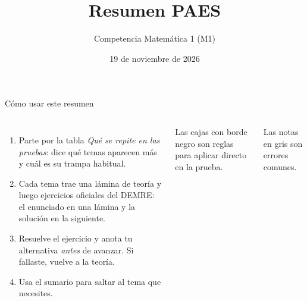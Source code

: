 \documentclass[aspectratio=169,11pt]{beamer}
\title[Resumen PAES: Competencia Matemática 1]{Resumen PAES}
\subtitle{Competencia Matemática 1 (M1)}
\date{19 de noviembre de 2026}
\begin{document}
\begin{frame}[plain]
  \titlepage
\end{frame}

\begin{frame}{Cómo usar este resumen}
\begin{columns}[T,onlytextwidth]
\small
\begin{enumerate}
\item Parte por la tabla \emph{Qué se repite en las pruebas}: dice qué temas aparecen más y cuál es su trampa habitual.
\item Cada tema trae una lámina de teoría y luego ejercicios oficiales del DEMRE: el enunciado en una lámina y la solución en la siguiente.
\item Resuelve el ejercicio y anota tu alternativa \emph{antes} de avanzar. Si fallaste, vuelve a la teoría.
\item Usa el sumario para saltar al tema que necesites.
\end{enumerate}
\begin{cajaregla}\footnotesize Las cajas con borde negro son reglas para aplicar directo en la prueba.\end{cajaregla}
\begin{notagris}\footnotesize Las notas en gris son errores comunes.\end{notagris}
\end{columns}
\end{frame}
\end{document}
